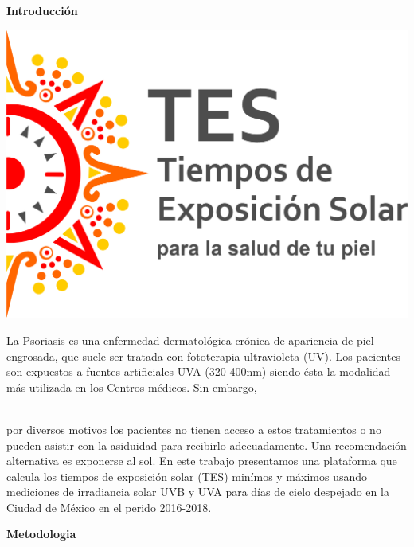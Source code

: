 \documentclass{article}
\begin{document}
\begin{multicols}{2}
\changefontsizes{13pt}
\begin{center}
\begin{shaded}
\textbf{\textcolor{na}{Introducción}}
\end{shaded}
\end{center}
\begin{minipage}{0.4\linewidth}
\includegraphics[scale=0.38]{images/TES.png}
\end{minipage}
\begin{minipage}{0.6\linewidth}
La Psoriasis es una enfermedad dermatológica crónica de apariencia de piel engrosada, que suele ser 
tratada con fototerapia ultravioleta (UV). Los pacientes son expuestos a fuentes artificiales UVA (320-400nm) 
siendo ésta la modalidad más utilizada en los Centros médicos. Sin embargo,
\end{minipage} \vspace{-0.1cm}\\por diversos motivos los pacientes no tienen acceso a estos tratamientos o no pueden asistir con 
la asiduidad para recibirlo adecuadamente. Una recomendación alternativa es exponerse al sol. En este trabajo presentamos 
una plataforma que calcula los tiempos de exposición solar (TES) minímos y máximos usando mediciones de irradiancia solar 
UVB y UVA para días de cielo despejado en la Ciudad de México en el perido 2016-2018.
\vspace{0.05cm}
\begin{center}
\begin{shaded}
\textbf{\textcolor{na}{Metodologia}}
\end{shaded}

\end{center}
\end{multicols}
\end{document}
